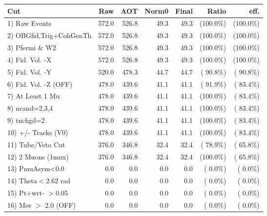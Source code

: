  \begin{table}[h!]\centering
 \begin{tabular}{||l||r|r|r|r|r|r||}
 \hline
 \hline
 Cut & Raw & AOT & Norm0 & Final & Ratio & eff.       \\
 \hline
  1) Raw Events           &        572.0 &        526.8 &         49.3 &         49.3 & (100.0\%) & (100.0\%) \\
  2) OBGfid,Trig+CohGenTh &        572.0 &        526.8 &         49.3 &         49.3 & (100.0\%) & (100.0\%) \\
  3) Pfermi \& W2         &        572.0 &        526.8 &         49.3 &         49.3 & (100.0\%) & (100.0\%) \\
  4) Fid. Vol. -X         &        572.0 &        526.8 &         49.3 &         49.3 & (100.0\%) & (100.0\%) \\
  5) Fid. Vol. -Y         &        520.0 &        478.3 &         44.7 &         44.7 & ( 90.8\%) & ( 90.8\%) \\
  6) Fid. Vol. -Z (OFF)   &        478.0 &        439.6 &         41.1 &         41.1 & ( 91.9\%) & ( 83.4\%) \\
  7) At Least 1 Mu        &        478.0 &        439.6 &         41.1 &         41.1 & (100.0\%) & ( 83.4\%) \\
  8) ncand=2,3,4          &        478.0 &        439.6 &         41.1 &         41.1 & (100.0\%) & ( 83.4\%) \\
  9) tnchgd=2             &        478.0 &        439.6 &         41.1 &         41.1 & (100.0\%) & ( 83.4\%) \\
 10) +/- Tracks (V0)      &        478.0 &        439.6 &         41.1 &         41.1 & (100.0\%) & ( 83.4\%) \\
 11) Tube/Veto Cut        &        376.0 &        346.8 &         32.4 &         32.4 & ( 78.9\%) & ( 65.8\%) \\
 12) 2 Muons (1mux)       &        376.0 &        346.8 &         32.4 &         32.4 & (100.0\%) & ( 65.8\%) \\
 13) PmuAsym<0.0          &          0.0 &          0.0 &          0.0 &          0.0 & (  0.0\%) & (  0.0\%) \\
 14) Theta$<$2.62 rad     &          0.0 &          0.0 &          0.0 &          0.0 & (  0.0\%) & (  0.0\%) \\
 15) Pt+wrt- $>$0.05      &          0.0 &          0.0 &          0.0 &          0.0 & (  0.0\%) & (  0.0\%) \\
 16) Mee $>$ 2.0  (OFF)   &          0.0 &          0.0 &          0.0 &          0.0 & (  0.0\%) & (  0.0\%) \\

\end{tabular}
\end{table}
